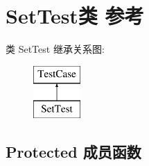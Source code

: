 \hypertarget{class_set_test}{}\section{Set\+Test类 参考}
\label{class_set_test}
类 Set\+Test 继承关系图\+:\begin{figure}[H]
\begin{center}
\leavevmode
\includegraphics[height=2.000000cm]{class_set_test}
\end{center}
\end{figure}
\subsection*{Protected 成员函数}
